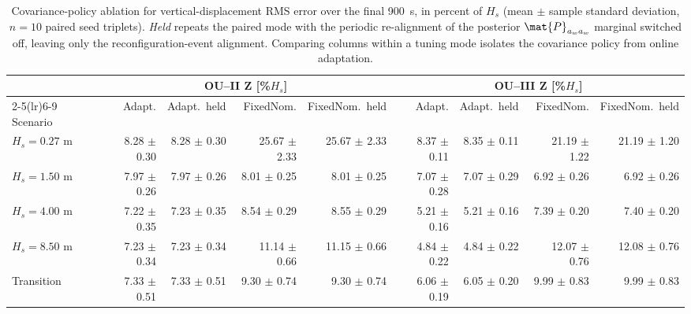 \begin{table}[t]
  \centering
  \caption{Covariance-policy ablation for vertical-displacement RMS error over the final \SI{900}{s}, in percent of $H_s$ (mean $\pm$ sample standard deviation, $n=10$ paired seed triplets). \emph{Held} repeats the paired mode with the periodic re-alignment of the posterior $\mat{P}_{a_w a_w}$ marginal switched off, leaving only the reconfiguration-event alignment. Comparing columns within a tuning mode isolates the covariance policy from online adaptation.}
  \label{tab:ou_mc_covsync}
  \footnotesize
  \setlength{\tabcolsep}{3.2pt}
  \begin{tabular}{@{}lrrrrrrrr@{}}
    \toprule
    & \multicolumn{4}{c}{OU--II Z [\%$H_s$]} & \multicolumn{4}{c}{OU--III Z [\%$H_s$]} \\
    \cmidrule(lr){2-5}\cmidrule(lr){6-9}
    Scenario & Adapt. & Adapt.\ held & FixedNom. & FixedNom.\ held & Adapt. & Adapt.\ held & FixedNom. & FixedNom.\ held \\
    \midrule
    $H_s=0.27$ m & 8.28 $\pm$ 0.30 & 8.28 $\pm$ 0.30 & 25.67 $\pm$ 2.33 & 25.67 $\pm$ 2.33 & 8.37 $\pm$ 0.11 & 8.35 $\pm$ 0.11 & 21.19 $\pm$ 1.22 & 21.19 $\pm$ 1.20 \\
    $H_s=1.50$ m & 7.97 $\pm$ 0.26 & 7.97 $\pm$ 0.26 & 8.01 $\pm$ 0.25 & 8.01 $\pm$ 0.25 & 7.07 $\pm$ 0.28 & 7.07 $\pm$ 0.29 & 6.92 $\pm$ 0.26 & 6.92 $\pm$ 0.26 \\
    $H_s=4.00$ m & 7.22 $\pm$ 0.35 & 7.23 $\pm$ 0.35 & 8.54 $\pm$ 0.29 & 8.55 $\pm$ 0.29 & 5.21 $\pm$ 0.16 & 5.21 $\pm$ 0.16 & 7.39 $\pm$ 0.20 & 7.40 $\pm$ 0.20 \\
    $H_s=8.50$ m & 7.23 $\pm$ 0.34 & 7.23 $\pm$ 0.34 & 11.14 $\pm$ 0.66 & 11.15 $\pm$ 0.66 & 4.84 $\pm$ 0.22 & 4.84 $\pm$ 0.22 & 12.07 $\pm$ 0.76 & 12.08 $\pm$ 0.76 \\
    Transition & 7.33 $\pm$ 0.51 & 7.33 $\pm$ 0.51 & 9.30 $\pm$ 0.74 & 9.30 $\pm$ 0.74 & 6.06 $\pm$ 0.19 & 6.05 $\pm$ 0.20 & 9.99 $\pm$ 0.83 & 9.99 $\pm$ 0.83 \\
    \bottomrule
  \end{tabular}
\end{table}


